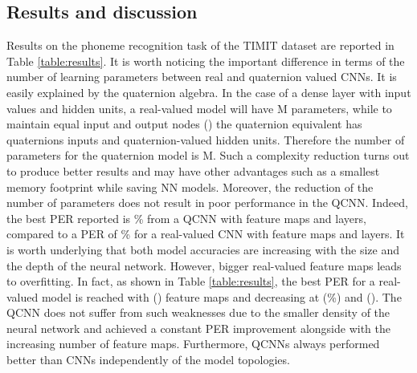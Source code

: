\documentclass[a4paper]{article}
\begin{document}
\subsection{Results and discussion}
\label{sec:results}
Results on the phoneme recognition task of the TIMIT dataset are reported in Table \ref{table:results}. It is worth noticing the important difference in terms of the number of learning parameters between real and quaternion valued CNNs. It is easily explained by the quaternion algebra. In the case of a dense layer with  input values and  hidden units, a real-valued model will have M parameters, while to maintain equal input and output nodes () the quaternion equivalent has  quaternions inputs and  quaternion-valued hidden units. Therefore the number of parameters for the quaternion model is M. Such a complexity reduction turns out to produce better results and may have other advantages such as a smallest memory footprint while saving NN models. Moreover, the reduction of the number of parameters does not result in poor performance in the QCNN. Indeed, the best PER reported is \% from a QCNN with  feature maps and  layers, compared to a PER of \% for a real-valued CNN with  feature maps and  layers. It is worth underlying that both model accuracies are increasing with the size and the depth of the neural network. However, bigger real-valued feature maps leads to overfitting. In fact, as shown in Table \ref{table:results}, the best PER for a real-valued model is reached with  () feature maps and decreasing at  (\%) and  (). The QCNN does not suffer from such weaknesses due to the smaller density of the neural network and achieved a constant PER improvement alongside with the increasing number of feature maps. Furthermore, QCNNs always performed better than CNNs independently of the model topologies.   
\end{document}
